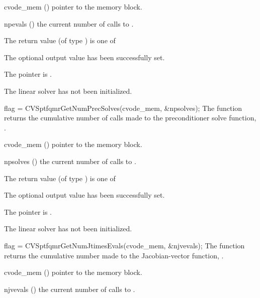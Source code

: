 {
  \begin{args}
  \item[cvode\_mem] ()
    pointer to the {\cvode} memory block.
  \item[npevals] ()
    the current number of calls to .
  \end{args}
}
{
  The return value  (of type ) is one of
  \begin{args}
  \item[\Id{CVSPTFQMR\_SUCCESS}] 
    The optional output value has been successfully set.
  \item[\Id{CVSPTFQMR\_MEM\_NULL}]
    The  pointer is .
  \item[\Id{CVSPTFQMR\_LMEM\_NULL}]
    The {\cvsptfqmr} linear solver has not been initialized.
  \end{args}
}
{}
{
  flag = CVSptfqmrGetNumPrecSolves(cvode\_mem, \&npsolves);
}
{
  The function  returns the
  cumulative number of calls made to the preconditioner 
  solve function, .
}
{
  \begin{args}
  \item[cvode\_mem] ()
    pointer to the {\cvode} memory block.
  \item[npsolves] ()
    the current number of calls to .
  \end{args}
}
{
  The return value  (of type ) is one of
  \begin{args}
  \item[\Id{CVSPTFQMR\_SUCCESS}] 
    The optional output value has been successfully set.
  \item[\Id{CVSPTFQMR\_MEM\_NULL}]
    The  pointer is .
  \item[\Id{CVSPTFQMR\_LMEM\_NULL}]
    The {\cvsptfqmr} linear solver has not been initialized.
  \end{args}
}
{}
{
  flag = CVSptfqmrGetNumJtimesEvals(cvode\_mem, \&njvevals);
}
{
  The function  returns the
  cumulative number made to the Jacobian-vector function,
  .
}
{
  \begin{args}
  \item[cvode\_mem] ()
    pointer to the {\cvode} memory block.
  \item[njvevals] ()
    the current number of calls to .
  \end{args}
}
